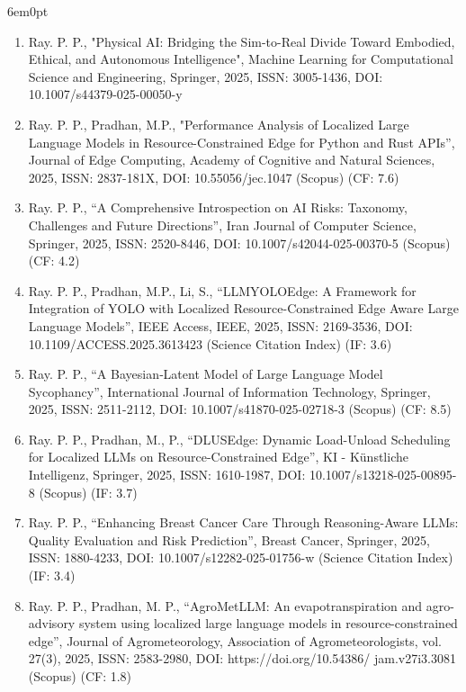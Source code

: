 \documentclass[11pt,a4paper]{moderncv}
\begin{document}
\begin{adjustwidth}{6em}{0pt}
\begin{enumerate}
		\item Ray. P. P., "Physical AI: Bridging the Sim-to-Real Divide Toward Embodied, Ethical, and Autonomous Intelligence", Machine Learning for Computational Science and Engineering, Springer, 2025, ISSN: 3005-1436, DOI: 10.1007/s44379-025-00050-y
		
		\item Ray. P. P., Pradhan, M.P., "Performance Analysis of Localized Large Language Models in Resource-Constrained Edge for Python and Rust APIs”, Journal of Edge Computing, Academy of Cognitive and Natural Sciences, 2025, ISSN: 2837-181X, DOI: 10.55056/jec.1047 (Scopus) (CF: 7.6) 
		
		\item Ray. P. P., “A Comprehensive Introspection on AI Risks: Taxonomy, Challenges and Future Directions”, Iran Journal of Computer Science, Springer, 2025, ISSN: 2520-8446, DOI: 10.1007/s42044-025-00370-5 (Scopus) (CF: 4.2)
		
		
		\item Ray. P. P., Pradhan, M.P., Li, S., “LLMYOLOEdge: A Framework for Integration of YOLO with Localized Resource-Constrained Edge Aware Large Language Models”, IEEE Access, IEEE, 2025, ISSN: 2169-3536, DOI: 10.1109/ACCESS.2025.3613423 (Science Citation Index) (IF: 3.6)
		
		\item Ray. P. P., “A Bayesian‐Latent Model of Large Language Model Sycophancy”, International Journal of Information Technology, Springer, 2025, ISSN: 2511-2112, DOI: 10.1007/s41870-025-02718-3 (Scopus) (CF: 8.5)
		
		\item Ray. P. P., Pradhan, M., P., “DLUSEdge: Dynamic Load-Unload Scheduling for Localized LLMs on Resource-Constrained Edge”, KI - Künstliche Intelligenz, Springer, 2025, ISSN: 1610-1987, DOI: 10.1007/s13218-025-00895-8 (Scopus) (IF: 3.7) 
	
		\item Ray. P. P., “Enhancing Breast Cancer Care Through Reasoning-Aware LLMs: Quality Evaluation and Risk Prediction”, Breast Cancer, Springer, 2025, ISSN: 1880-4233, DOI: 10.1007/s12282-025-01756-w (Science Citation Index) (IF: 3.4) 
		
				
		\item Ray. P. P., Pradhan, M. P., “AgroMetLLM: An evapotranspiration and agro-advisory system using localized large language models in resource-constrained edge”, Journal of Agrometeorology, Association of Agrometeorologists, vol. 27(3), 2025, ISSN: 2583-2980, DOI: https://doi.org/10.54386/ jam.v27i3.3081 (Scopus) (CF: 1.8)
		

\end{enumerate}
\end{adjustwidth}
\end{document}
